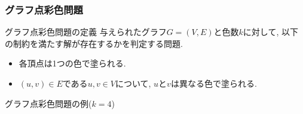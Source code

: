 \documentclass[dvipdfmx,11pt]{beamer}
\begin{document}
\begin{frame}\frametitle{グラフ点彩色問題}
    
  \begin{block}{グラフ点彩色問題の定義}
    与えられたグラフ$G=(V, E)$と色数$k$に対して, 以下の制約を満たす解が存在するかを判定する問題.
    \begin{itemize}
      \item 各頂点は1つの色で塗られる.
      \item $(u, v) \in E$である$u, v \in V$について, $u$と$v$は異なる色で塗られる.
    \end{itemize}
  \end{block}
  
  \begin{exampleblock}{グラフ点彩色問題の例($k=4$)}
    \begin{columns}
      \begin{column}{1.0\textwidth}
        \centering
        
      \end{column}
    \end{columns}
  \end{exampleblock}
  

\end{frame}

\end{document}
